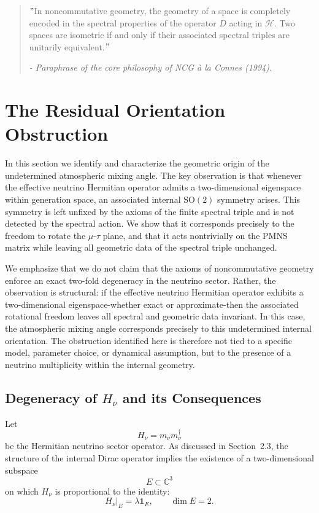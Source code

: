\begin{quote}
\("\)In noncommutative geometry, the geometry of a space is completely encoded in the spectral properties of the operator $D$ acting in $\mathcal H$. Two spaces are isometric if and only if their associated spectral triples are unitarily equivalent.\("\)

\emph{- Paraphrase of the core philosophy of NCG \`a la Connes (1994).}
\end{quote}


\section{The Residual Orientation Obstruction}

In this section we identify and characterize the geometric origin of the undetermined atmospheric mixing angle. The key observation is that whenever the effective neutrino Hermitian operator admits a two-dimensional eigenspace within generation space, an associated internal $\mathrm{SO}(2)$ symmetry arises. This symmetry is left unfixed by the axioms of the finite spectral triple and is not detected by the spectral action. We show that it corresponds precisely to the freedom to rotate the $\mu$-$\tau$ plane, and that it acts nontrivially on the PMNS matrix while leaving all geometric data of the spectral triple unchanged.

We emphasize that we do not claim that the axioms of noncommutative geometry enforce an exact two-fold degeneracy in the neutrino sector. Rather, the observation is structural: if the effective neutrino Hermitian operator exhibits a two-dimensional eigenspace-whether exact or approximate-then the associated rotational freedom leaves all spectral and geometric data invariant. In this case, the atmospheric mixing angle corresponds precisely to this undetermined internal orientation. The obstruction identified here is therefore not tied to a specific model, parameter choice, or dynamical assumption, but to the presence of a neutrino multiplicity within the internal geometry.

\subsection{Degeneracy of $H_\nu$ and its Consequences}

Let
\[
H_\nu = m_\nu m_\nu^\dagger
\]
be the Hermitian neutrino sector operator. As discussed in Section~2.3, the structure of the internal Dirac operator implies the existence of a two-dimensional subspace
\[
E \subset \mathbb C^3
\]
on which $H_\nu$ is proportional to the identity:
\begin{equation}
H_\nu|_E = \lambda \mathbf 1_E,
\qquad \dim E = 2.
\end{equation}

